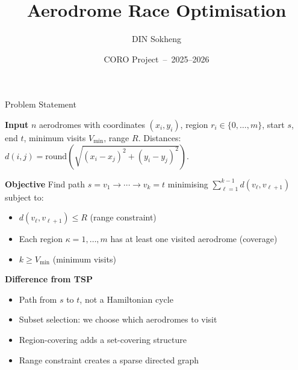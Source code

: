 \documentclass{beamer}
\title[Aerodrome Race Optimisation]{Aerodrome Race Optimisation}
\author[DIN Sokheng]{DIN Sokheng}
\institute{ENSIIE --- Universit\'e Paris-Saclay}
\date{CORO Project \,--\, 2025--2026}
\begin{document}
\maketitle

\begin{frame}{Problem Statement}

\begin{block}{\textbf{Input}}
\small
$n$ aerodromes with coordinates $(x_i, y_i)$, region $r_i \in \{0,\ldots,m\}$,
start $s$, end $t$, minimum visits $V_{\min}$, range $R$.
Distances: $d(i,j) = \mathrm{round}\!\left(\sqrt{(x_i-x_j)^2+(y_i-y_j)^2}\right)$.
\end{block}

\begin{block}{\textbf{Objective}}
\small
Find path $s = v_1 \to \cdots \to v_k = t$ minimising
$\displaystyle\sum_{\ell=1}^{k-1} d(v_\ell, v_{\ell+1})$ subject to:
\begin{itemize}\setlength\itemsep{2pt}
  \item $d(v_\ell, v_{\ell+1}) \leq R$ \quad (range constraint)
  \item Each region $\kappa=1,\ldots,m$ has at least one visited aerodrome \quad (coverage)
  \item $k \geq V_{\min}$ \quad (minimum visits)
\end{itemize}
\end{block}

\begin{block}{\textbf{Difference from TSP}}
\small
\begin{itemize}\setlength\itemsep{2pt}
  \item Path from $s$ to $t$, not a Hamiltonian cycle
  \item Subset selection: we choose which aerodromes to visit
  \item Region-covering adds a set-covering structure
  \item Range constraint creates a sparse directed graph
\end{itemize}
\end{block}

\end{frame}
\end{document}
